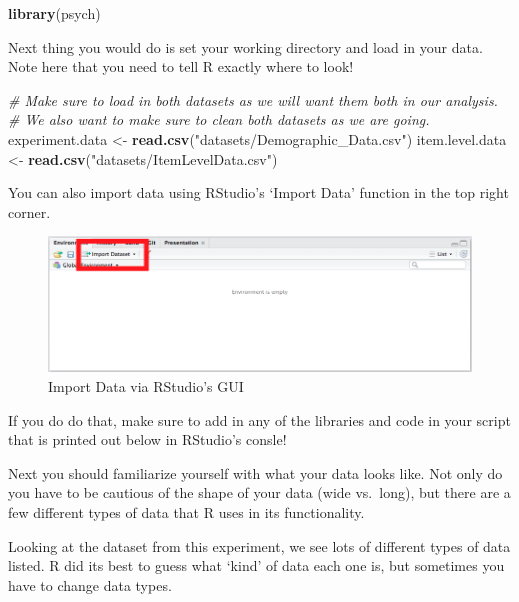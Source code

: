\documentclass[]{book}
\newenvironment{Shaded}{\begin{snugshade}}{\end{snugshade}}
\newcommand{\KeywordTok}[1]{\textcolor[rgb]{0.13,0.29,0.53}{\textbf{#1}}}
\newcommand{\StringTok}[1]{\textcolor[rgb]{0.31,0.60,0.02}{#1}}
\newcommand{\CommentTok}[1]{\textcolor[rgb]{0.56,0.35,0.01}{\textit{#1}}}
\newcommand{\NormalTok}[1]{#1}
\theoremstyle{definition}
\theoremstyle{definition}
\theoremstyle{definition}
\theoremstyle{remark}
\begin{document}
\begin{Shaded}
\begin{Highlighting}[]
 \KeywordTok{library}\NormalTok{(psych)}
\end{Highlighting}
\end{Shaded}

Next thing you would do is set your working directory and load in your
data. Note here that you need to tell R exactly where to look!

\begin{Shaded}
\begin{Highlighting}[]
\CommentTok{# Make sure to load in both datasets as we will want them both in our analysis.}
\CommentTok{# We also want to make sure to clean both datasets as we are going. }
\NormalTok{experiment.data <-}\StringTok{ }\KeywordTok{read.csv}\NormalTok{(}\StringTok{"datasets/Demographic_Data.csv"}\NormalTok{)}
\NormalTok{item.level.data <-}\StringTok{ }\KeywordTok{read.csv}\NormalTok{(}\StringTok{"datasets/ItemLevelData.csv"}\NormalTok{)}
\end{Highlighting}
\end{Shaded}

You can also import data using RStudio's `Import Data' function in the
top right corner.

\begin{figure}
\centering
\includegraphics{img/importdatagui.png}
\caption{Import Data via RStudio's GUI}
\end{figure}

If you do do that, make sure to add in any of the libraries and code in
your script that is printed out below in RStudio's consle!

Next you should familiarize yourself with what your data looks like. Not
only do you have to be cautious of the shape of your data (wide
vs.~long), but there are a few different types of data that R uses in
its functionality.

Looking at the dataset from this experiment, we see lots of different
types of data listed. R did its best to guess what `kind' of data each
one is, but sometimes you have to change data types.
\end{document}
